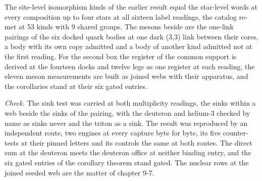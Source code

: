 \begin{chproof}[census]
The site-level isomorphism kinds of the earlier result equal the star-level words at every composition up to four stars at all sixteen label readings, the catalog re-met at 53 kinds with 9 shared groups. The mesons beside are the one-link pairings of the six docked quark bodies at one dark (3,3) link between their cores, a body with its own copy admitted and a body of another kind admitted not at the first reading. For the second box the register of the common support is derived at the fourteen docks and twelve legs as one register at each reading, the eleven meson measurements are built as joined webs with their apparatus, and the corollaries stand at their six gated entries.

\emph{Check.} The sink test was carried at both multiplicity readings, the sinks within a web beside the sinks of the pairing, with the deuteron and helium-3 checked by name as sinks never and the triton as a sink. The result was reproduced by an independent route, two engines at every capture byte for byte, its five counter-tests at their pinned letters and its controls the same at both routes.
The direct sum at the deuteron meets the deuteron office at neither binding entry, and the six gated entries of the corollary theorem stand gated. The nuclear rows at the joined seeded web are the matter of chapter 9-7.
\end{chproof}
\label{chend:VII-6-hadron-spectrum-and-the-mesons}
